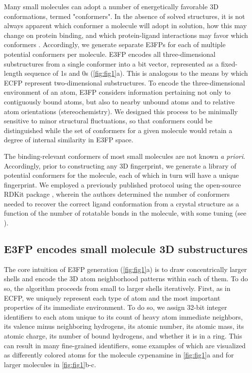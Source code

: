 \documentclass[../main.tex]{subfiles}
\begin{document}
\begin{refsection}
Many small molecules can adopt a number of energetically favorable 3D conformations, termed "conformers".
In the absence of solved structures, it is not always apparent which conformer a molecule will adopt in solution, how this may change on protein binding, and which protein-ligand interactions may favor which conformers  \cite{barelier_2015}.
Accordingly, we generate separate E3FPs for each of multiple potential conformers per molecule.
E3FP encodes all three-dimensional substructures from a single conformer into a bit vector, represented as a fixed-length sequence of 1s and 0s (\cref{fig:fig1}a).
This is analogous to the means by which ECFP represent two-dimensional substructures.
To encode the three-dimensional environment of an atom, E3FP considers information pertaining not only to contiguously bound atoms, but also to nearby unbound atoms and to relative atom orientations (stereochemistry).
We designed this process to be minimally sensitive to minor structural fluctuations, so that conformers could be distinguished while the set of conformers for a given molecule would retain a degree of internal similarity in E3FP space.

The binding-relevant conformers of most small molecules are not known \emph{a priori}.
Accordingly, prior to constructing any 3D fingerprint, we generate a library of potential conformers for the molecule, each of which in turn will have a unique fingerprint.
We employed a previously published protocol using the open-source RDKit package  \cite{ebejer_2012}, wherein the authors determined the number of conformers needed to recover the correct ligand conformation from a crystal structure as a function of the number of rotatable bonds in the molecule, with some tuning (see ).

\subsection*{E3FP encodes small molecule 3D substructures}

The core intuition of E3FP generation (\cref{fig:fig1}a) is to draw concentrically larger shells and encode the 3D atom neighborhood patterns within each of them.
To do so, the algorithm proceeds from small to larger shells iteratively.
First, as in ECFP, we uniquely represent each type of atom and the most important properties of its immediate environment.
To do so, we assign 32-bit integer identifiers to each atom unique to its count of heavy atom immediate neighbors, its valence minus neighboring hydrogens, its atomic number, its atomic mass, its atomic charge, its number of bound hydrogens, and whether it is in a ring.
This can result in many fine-grained identifiers, some examples of which are visualized as differently colored atoms for the molecule cypenamine in \cref{fig:fig1}a and for larger molecules in \cref{fig:fig1}b-c.


\end{refsection}
\end{document}
